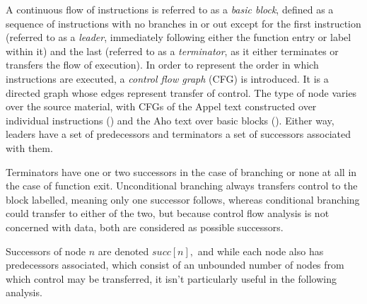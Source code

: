 \documentclass{article}
\begin{document}

A continuous flow of instructions is referred to as a \textit{basic block}, defined as a sequence of instructions with no branches in or out except for the first instruction (referred to as a \textit{leader}, immediately following either the function entry or label within it) and the last (referred to as a \textit{terminator}, as it either terminates or transfers the flow of execution). %
In order to represent the order in which instructions are executed, a \textit{control flow graph} (CFG) is introduced. It is a directed graph whose edges represent transfer of control. The type of node varies over the source material, with CFGs of the Appel text constructed over individual instructions (\cite{tiger}) and the Aho text over basic blocks (\cite{dragon}).
Either way, leaders have a set of predecessors and terminators a set of successors associated with them.

Terminators have one or two successors in the case of branching or none at all in the case of function exit. %
Unconditional branching always transfers control to the block labelled, meaning only one successor follows, whereas conditional branching could transfer to either of the two, but because control flow analysis is not concerned with data, both are considered as possible successors. %

Successors of node \(n\) are denoted \( \mathit{succ}[n], \)
and while each node also has predecessors associated, which consist of an  unbounded number of nodes from which control may be transferred, it isn't particularly useful in the following analysis.



\end{document}
